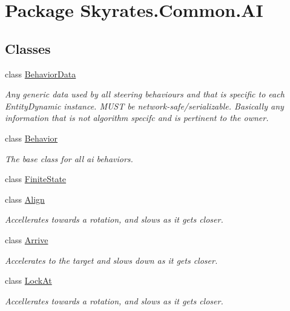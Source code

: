 \hypertarget{namespace_skyrates_1_1_common_1_1_a_i}{\section{Package Skyrates.\-Common.\-A\-I}
\label{namespace_skyrates_1_1_common_1_1_a_i}
}
\subsection*{Classes}
\begin{DoxyCompactItemize}
\item 
class \hyperlink{class_skyrates_1_1_common_1_1_a_i_1_1_behavior_data}{Behavior\-Data}
\begin{DoxyCompactList}\small\item\em Any generic data used by all steering behaviours and that is specific to each Entity\-Dynamic instance. M\-U\-S\-T be network-\/safe/serializable. Basically any information that is not algorithm specifc and is pertinent to the owner. \end{DoxyCompactList}\item 
class \hyperlink{class_skyrates_1_1_common_1_1_a_i_1_1_behavior}{Behavior}
\begin{DoxyCompactList}\small\item\em The base class for all ai behaviors. \end{DoxyCompactList}\item 
class \hyperlink{class_skyrates_1_1_common_1_1_a_i_1_1_finite_state}{Finite\-State}
\item 
class \hyperlink{class_skyrates_1_1_common_1_1_a_i_1_1_align}{Align}
\begin{DoxyCompactList}\small\item\em Accellerates towards a rotation, and slows as it gets closer. \end{DoxyCompactList}\item 
class \hyperlink{class_skyrates_1_1_common_1_1_a_i_1_1_arrive}{Arrive}
\begin{DoxyCompactList}\small\item\em Accelerates to the target and slows down as it gets closer. \end{DoxyCompactList}\item 
class \hyperlink{class_skyrates_1_1_common_1_1_a_i_1_1_lock_at}{Lock\-At}
\begin{DoxyCompactList}\small\item\em Accellerates towards a rotation, and slows as it gets closer. \end{DoxyCompactList}\item 

\end{DoxyCompactItemize}
